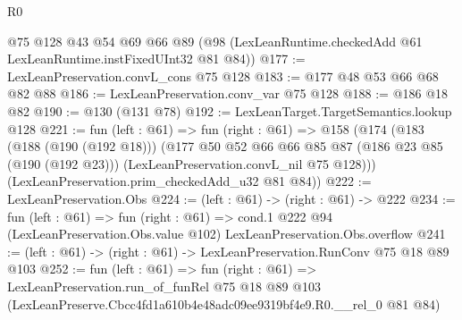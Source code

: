 \begin{lexlean}{R0}
\begin{coremodule}
    @75
    @128
    @43
    @54
    @69
    @66
    @89
    (@98 (LexLeanRuntime.checkedAdd @61 LexLeanRuntime.instFixedUInt32 @81 @84))
@177 := LexLeanPreservation.convL_cons @75 @128
@183 := @177 @48 @53 @66 @68 @82 @88
@186 := LexLeanPreservation.conv_var @75 @128
@188 := @186 @18 @82
@190 := @130 (@131 @78)
@192 := LexLeanTarget.TargetSemantics.lookup @128
@221 := fun (left : @61) =>
  fun (right : @61) =>
  @158
    (@174
      (@183
        (@188 (@190 (@192 @18)))
        (@177
          @50
          @52
          @66
          @66
          @85
          @87
          (@186 @23 @85 (@190 (@192 @23)))
          (LexLeanPreservation.convL_nil @75 @128)))
      (LexLeanPreservation.prim_checkedAdd_u32 @81 @84))
@222 := LexLeanPreservation.Obs
@224 := (left : @61) -> (right : @61) -> @222
@234 := fun (left : @61) =>
  fun (right : @61) =>
  cond.{1} @222 @94 (LexLeanPreservation.Obs.value @102) LexLeanPreservation.Obs.overflow
@241 := (left : @61) -> (right : @61) -> LexLeanPreservation.RunConv @75 @18 @89 @103
@252 := fun (left : @61) =>
  fun (right : @61) =>
  LexLeanPreservation.run_of_funRel
    @75
    @18
    @89
    @103
    (LexLeanPreserve.Cbcc4fd1a610b4e48adc09ee9319bf4e9.R0.__rel_0 @81 @84)
\end{coremodule}
\end{lexlean}

